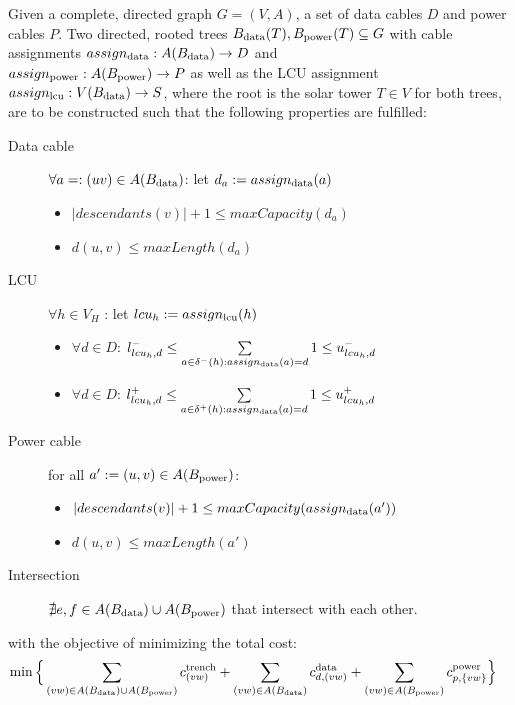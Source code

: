 \begin{tcolorbox}
\begin{problem}\label{prob:cabling_problem}
  Given a complete, directed graph $G=(V,A)$, a set of data cables $D$ and power cables $P$. Two directed, rooted trees $B_{\text{data}}(T),B_{\text{power}}(T)\subseteq G$ with cable assignments $assign_{\text{data}}:A(B_{\text{data}})\to D$ and \\
  $assign_{\text{power}}: A(B_{\text{power}})\to P$ as well as the LCU assignment $assign_{\text{lcu}}: V(B_{\text{data}})\to S$, where the root is the solar tower $T\in V$ for both trees, are to be constructed such that the following properties are fulfilled:
  \begin{description}
    \item[Data cable] $\forall a=:(uv)\in A(B_{\text{data}})$: let $d_a := assign_{\text{data}}(a)$
    \begin{itemize}
      \item $|descendants(v)| + 1 \leq maxCapacity(d_a)$
      \item $d(u,v) \leq maxLength(d_a)$
    \end{itemize}
    
    \item[LCU] $\forall h\in V_H$ : let $lcu_h := assign_{\text{lcu}}(h)$
    \begin{itemize}
      \item $\forall d\in D$: 
      $l_{lcu_h,d}^-
      \leq
      \sum\limits_{a\in\delta^-(h):assign_{\text{data}}(a)=d} 1
      \leq
      u_{lcu_h,d}^-$
      \item $\forall d\in D$: 
      $l_{lcu_h,d}^+
      \leq
      \sum\limits_{a\in\delta^+(h):assign_{\text{data}}(a)=d} 1
      \leq
      u_{lcu_h,d}^+$
    \end{itemize}
      
    \item[Power cable] for all $a':=(u,v)\in A(B_{\text{power}})$:
    \begin{itemize}
      \item $|descendants(v)| + 1 \leq maxCapacity(assign_{\text{data}}(a'))$
      \item $d(u,v) \leq maxLength(a')$
    \end{itemize}
    \item[Intersection] $\nexists e,f\in A(B_{\text{data}})\cup A(B_{\text{power}})$ that intersect with each other.
  \end{description}
  with the objective of minimizing the total cost:
  \begin{align*}
    \min\Big\{
      &\sum\limits_{(vw)\in A(B_{\text{data}})\cup A(B_{\text{power}})} c_{(vw)}^\text{trench} +\sum\limits_{(vw)\in A(B_{\text{data}})} c_{d,(vw)}^\text{data}
      +\sum\limits_{(vw)\in A(B_{\text{power}})} c_{p,\{vw\}}^\text{power}
    \Big\}
  \end{align*}
\end{problem}
\end{tcolorbox}

